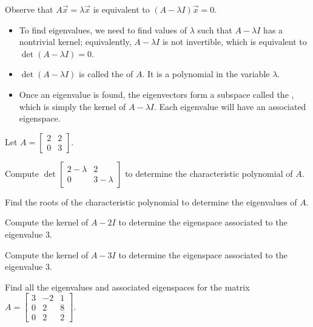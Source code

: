 \begin{applicationActivities}{3}{27}
\begin{observation}
Observe that $A\vec{x}=\lambda \vec{x}$ is equivalent to $(A-\lambda I)\vec{x} = 0$.
\begin{itemize}
\item To find eigenvalues, we need to find values of $\lambda$ such that $A-\lambda I$ has a nontrivial kernel; equivalently, $A-\lambda I$ is not invertible, which is equivalent to $\det(A-\lambda I)=0$.  
\item $\det(A-\lambda I)$ is called the  of $A$.  It is a polynomial in the variable $\lambda$.
\item Once an eigenvalue is found, the eigenvectors form a subspace called the , which is simply the kernel of $A-\lambda I$.  Each eigenvalue will have an associated eigenspace.
\end{itemize}
\end{observation}

\begin{activity}{20}
Let $A = \begin{bmatrix} 2 & 2 \\ 0 & 3 \end{bmatrix}$.
\begin{subactivity}
Compute $\det \begin{bmatrix} 2-\lambda & 2 \\ 0 & 3-\lambda \end{bmatrix}$ to determine the characteristic polynomial of $A$.
\end{subactivity}
\begin{subactivity}
Find the roots of the characteristic polynomial to determine the eigenvalues of $A$.
\end{subactivity}
\begin{subactivity}
Compute the kernel of $A-2I$ to determine the eigenspace associated to the eigenvalue $3$.
\end{subactivity}
\begin{subactivity}
Compute the kernel of $A-3I$ to determine the eigenspace associated to the eigenvalue $3$.
\end{subactivity}
\end{activity}


\begin{activity}{15}
  Find all the eigenvalues and associated eigenspaces for the matrix $A=\begin{bmatrix} 3 & -2 & 1 \\  0 & 2 & 8 \\ 0 & 2 & 2 \end{bmatrix}$.


\end{activity}
\end{applicationActivities}
